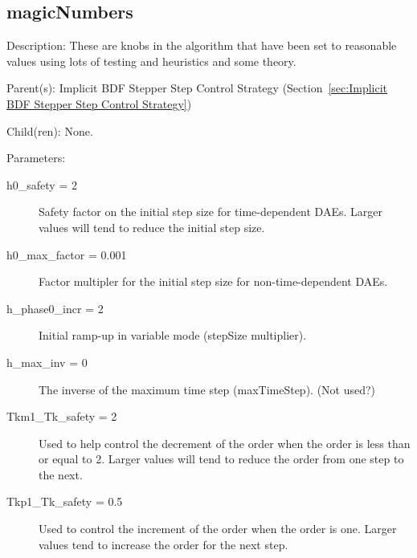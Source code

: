 \subsection{magicNumbers}
\label{sec:magicNumbers}

\begin{list}{}
  {\setlength{\leftmargin}{1.0in}
   \setlength{\labelwidth}{0.75in}
   \setlength{\labelsep}{0.125in}}
  \item[Description:]
    These are knobs in the algorithm that have been set to reasonable values using lots of testing and heuristics and some theory.
  \item[Parent(s):]
    Implicit BDF Stepper Step Control Strategy (Section~\ref{sec:Implicit BDF Stepper Step Control Strategy})
  \item[Child(ren):]
    None. 
  \item[Parameters:]
    \begin{description}
      \item[h0\_safety = 2] 
Safety factor on the initial step size for time-dependent DAEs.  Larger values will tend to reduce the initial step size.
      \item[h0\_max\_factor = 0.001] 
Factor multipler for the initial step size for non-time-dependent DAEs.
      \item[h\_phase0\_incr = 2] 
Initial ramp-up in variable mode (stepSize multiplier).
      \item[h\_max\_inv = 0] 
The inverse of the maximum time step (maxTimeStep). (Not used?)
      \item[Tkm1\_Tk\_safety = 2] 
Used to help control the decrement of the order when the order is less than or equal to 2.  Larger values will tend to reduce the order from one step to the next.
      \item[Tkp1\_Tk\_safety = 0.5] 
Used to control the increment of the order when the order is one.  Larger values tend to increase the order for the next step.

\end{description}
\end{list}
